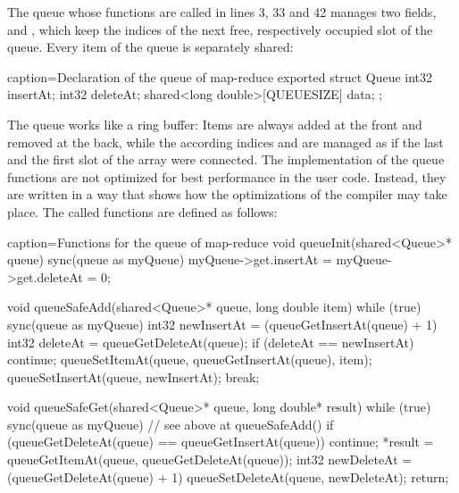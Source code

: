 The queue whose functions are called in lines 3, 33 and 42 manages two fields,  and , which keep the indices of the next free, respectively occupied slot of the queue. Every item of the queue is separately shared:
\begin{ccode}{caption=Declaration of the queue of map-reduce}
exported struct Queue { 
  int32 insertAt; 
  int32 deleteAt; 
  shared<long double>[QUEUESIZE] data; 
};
\end{ccode}
The queue works like a ring buffer: Items are always added at the front and removed at the back, while the according indices  and  are managed as if the last and the first slot of the array were connected. The implementation of the queue functions are not optimized for best performance in the user code. Instead, they are written in a way that shows how the optimizations of the compiler may take place. The called functions are defined as follows:

\begin{ccode}{caption=Functions for the queue of map-reduce}
void queueInit(shared<Queue>* queue) { 
  sync(queue as myQueue) { myQueue->get.insertAt = myQueue->get.deleteAt = 0; } 
}
 
void queueSafeAdd(shared<Queue>* queue, long double item) { 
  while (true) { 
    sync(queue as myQueue) {
      int32 newInsertAt = (queueGetInsertAt(queue) + 1) %
      int32 deleteAt = queueGetDeleteAt(queue); 
      if (deleteAt == newInsertAt) { continue; }
      queueSetItemAt(queue, queueGetInsertAt(queue), item); 
      queueSetInsertAt(queue, newInsertAt); 
      break; 
    } 
  }
}

void queueSafeGet(shared<Queue>* queue, long double* result) { 
  while (true) { 
    sync(queue as myQueue) { 
      // see above at queueSafeAdd() 
      if (queueGetDeleteAt(queue) == queueGetInsertAt(queue)) { continue; }
      *result = queueGetItemAt(queue, queueGetDeleteAt(queue)); 
      int32 newDeleteAt = (queueGetDeleteAt(queue) + 1) %
      queueSetDeleteAt(queue, newDeleteAt); 
      return; 
    } 
  } 
}
\end{ccode}

